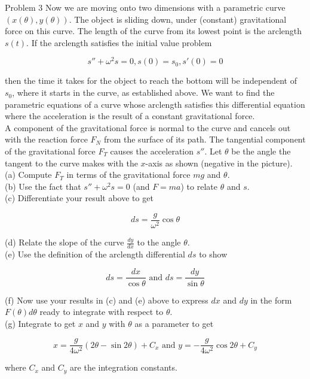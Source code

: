 \documentclass{article}
\begin{document}
    \begin{tbhtheorem}{Problem 3}
        Now we are moving onto two dimensions with a parametric curve $\left(x(\theta), y(\theta)\right)$. The object is sliding down, under (constant) gravitational force on this curve. The length of the curve from its
        lowest point is the arclength $s(t)$. If the arclength satisfies the initial value problem

        \[
            s'' + {\omega}^2 s = 0, s(0) = s_0, s'(0) = 0
        \]

        then the time it takes for the object to reach the bottom will be independent of $s_0$, where it starts in the curve, as established above. We want to find the parametric equations of a curve whose arclength
        satisfies this differential equation where the acceleration is the result of a constant gravitational force. \\

        A component of the gravitational force is normal to the curve and cancels out with the reaction force $F_N$ from the surface of its path. The tangential component of the gravitational force $F_T$ causes the
        acceleration $s''$. Let $\theta$ be the angle the tangent to the curve makes with the $x$-axis as shown (negative in the picture). \\

        (a) Compute $F_T$ in terms of the gravitational force $mg$ and $\theta$. \\
        (b) Use the fact that $s'' + {\omega}^{2}s = 0$ (and $F=ma$) to relate $\theta$ and $s$. \\
        (c) Differentiate your result above to get

        \[
            ds = \frac{g}{{\omega}^2}\cos{\theta}
        \]

        (d) Relate the slope of the curve $\frac{dy}{dx}$ to the angle $\theta$. \\
        (e) Use the definition of the arclength differential $ds$ to show

        \[
            ds = \frac{dx}{\cos{\theta}} \text{ and } ds = \frac{dy}{\sin{\theta}}
        \]

        (f) Now use your results in (c) and (e) above to express $dx$ and $dy$ in the form $F(\theta)d\theta$ ready to integrate with respect to $\theta$. \\
        (g) Integrate to get $x$ and $y$ with $\theta$ as a parameter to get

        \[
            x = \frac{g}{4\omega^2}(2\theta - \sin{2\theta}) + C_x \text{ and } y = -\frac{g}{4\omega^2}\cos{2\theta} + C_y
        \]

        where $C_x$ and $C_y$ are the integration constants.
    \end{tbhtheorem}
\end{document}

